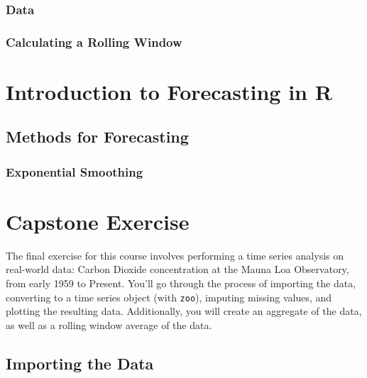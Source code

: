 \documentclass[
]{book}
\begin{document}
\hypertarget{data}{%
\subsection{Data}\label{data}}

\hypertarget{calculating-a-rolling-window}{%
\subsection{Calculating a Rolling Window}\label{calculating-a-rolling-window}}

\hypertarget{introduction-to-forecasting-in-r}{%
\chapter{Introduction to Forecasting in R}\label{introduction-to-forecasting-in-r}}

\hypertarget{methods-for-forecasting}{%
\section{Methods for Forecasting}\label{methods-for-forecasting}}

\hypertarget{exponential-smoothing}{%
\subsection{Exponential Smoothing}\label{exponential-smoothing}}

\hypertarget{capstone-exercise}{%
\chapter{Capstone Exercise}\label{capstone-exercise}}

The final exercise for this course involves performing a time series analysis on real-world data: Carbon Dioxide concentration at the Mauna Loa Observatory, from early 1959 to Present. You'll go through the process of importing the data, converting to a time series object (with \texttt{zoo}), imputing missing values, and plotting the resulting data. Additionally, you will create an aggregate of the data, as well as a rolling window average of the data.

\hypertarget{importing-the-data}{%
\section{Importing the Data}\label{importing-the-data}}
\end{document}
